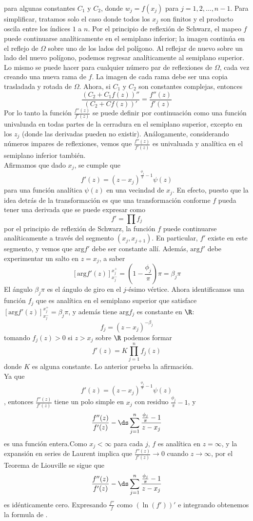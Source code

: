 \begin{teor}
		para algunas constantes $C_1$ y $C_2$, donde $w_j=f(x_j)$ para $j=1,2,\ldots,n-1$. 
		\proof Para simplificar, tratamos solo el caso donde todos los $x_j$ son finitos y el producto oscila entre los índices $1$ a $n$. Por el principio de reflexión de Schwarz,  el mapeo $f$ puede continuarse analíticamente en el semiplano inferior; la imagen continúa en el reflejo de $\Omega$ sobre uno de los lados del polígono. Al reflejar de nuevo sobre un lado del nuevo polígono, podemos regresar analíticamente al semiplano superior. Lo mismo se puede hacer para cualquier número par de reflexiones de $\Omega$, cada vez creando una nueva rama de $f$. La imagen de cada rama debe ser una copia trasladada y rotada de $\Omega$. Ahora, si $C_1$ y $C_2$ son constantes complejas, entonces
		$$\dfrac{(C_2+C_1f(z))''}{(C_2+Cf(z))'}=\dfrac{f''(z)}{f'(z)}$$
				Por lo tanto la función $\frac{f''(z)}{f'(z)}$ se puede definir por  continuación como una función univaluada en todas partes de la cerradura en el semiplano superior, excepto en los $z_j$ (donde las derivadas pueden no existir). Análogamente, considerando números impares de reflexiones, vemos que $\frac{f''(z)}{f'(z)}$ 	es univaluada y analítica en el semiplano inferior también.\\
		Afirmamos que dado $x_j$, se cumple que 
		$$f'(z)=(z-x_j)^{\frac{\phi_j}{\pi}-1}\psi(z)$$
		para una función analítica $\psi(z)$ en una vecindad de $x_j$. En efecto, puesto 	que la idea detrás de la transformación \SC  es que una transformación conforme $f$ pueda tener una derivada que se puede expresar 	como
		$$f'=\prod f_j$$
		 por el principio de reflexión de Schwarz, la función $f$ puede continuarse analíticamente a través del segmento $(x_j,x_{j+1})$.  En particular, $f'$ existe
		en este segmento, y vemos que $\mbox{arg} f'$ debe ser constante allí. Además, $\mbox{arg} f'$ debe experimentar un salto en $z = x_j$, a saber
		$$[\mbox{arg}f'(z)]_{x_j^{-}}^{x_j^{+}}=(1-\frac{\phi_j}{\pi})\pi=\beta_j\pi $$
		El ángulo $\beta_j\pi $ es el ángulo de giro en el $j$-ésimo vértice. Ahora identificamos una función $f_j$ que es analítica en el semiplano superior que  satisface $[\mbox{arg}f'(z)]_{x_j^{-}}^{x_j^{+}}=\beta_j\pi $, y  además tiene $\mbox{arg}f_j$ es constante en $\R$:
		$$f_j=(z-x_j)^{-\beta_j}$$
		tomando $f_j(z)>0$ si $z>x_j$ sobre $\R$ podemos formar
		$$f'(z)=K\prod_{j=1}^{n}f_j(z)$$
		donde $K$ es alguna constante. Lo anterior prueba la afirmación.\\
		Ya que $$f'(z)=(z-x_j)^{\frac{\phi_j}{\pi}-1}\psi(z)$$, entonces $\frac{f''(z)}{f'(z)}$  tiene un polo simple en $x_j$ con residuo $\frac{\phi_j}{\pi}-1$, y 
		$$\frac{f''(z)}{f'(z)}-\ds\sum_{j=1}^{n}\dfrac{\frac{\phi_j}{\pi}-1}{z-x_j}$$ es una función entera.Como $x_j<\infty$ para cada $j$, $f$ es analítica en $z=\infty$, y la expansión en series de Laurent implica que  $\frac{f''(z)}{f'(z)}\rightarrow0$ cuando $z\rightarrow\infty$, por el Teorema de Liouville se sigue que $$\frac{f''(z)}{f'(z)}-\ds\sum_{j=1}^{n}\dfrac{\frac{\phi_j}{\pi}-1}{z-x_j}$$
		es idénticamente cero. Expresando $\frac{f''}{f}$ como $(\ln (f'))'$ e integrando obtenemos la formula de \SC.\endproof
	\end{teor}
